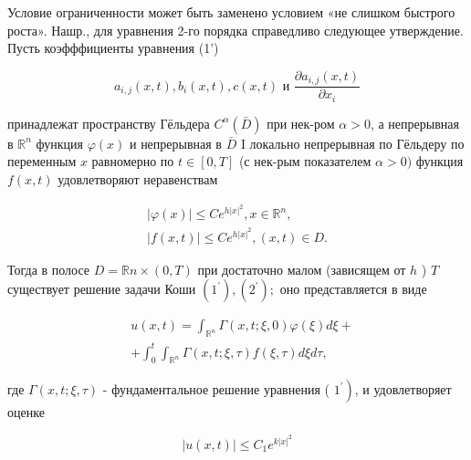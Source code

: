 \documentclass[10pt]{article}
\begin{document}
Условие ограниченности может быть заменено условием «не слишком быстрого роста». Нашр., для уравнения 2-го порядка справедливо следующее утверждение. Пусть коэфффициенты уравнения (1')



\[

a_{i, j}(x, t), b_{i}(x, t), c(x, t) \text { и } \frac{\partial a_{i, j}(x, t)}{\partial x_{i}}

\]



принадлежат пространству Гёльдера $C^{\alpha}(\bar{D})$ при нек-ром $\alpha>0$, а непрерывная в $\mathbb{R}^{n}$ функция $\varphi(x)$ и непрерывная в $\bar{D}$ I локально непрерывная по Гёльдеру по переменным $x$ равномерно по $t \in[0, T]$ (с нек-рым показателем $\alpha>0)$ функция $f(x, t)$ удовлетворяют неравенствам



\[

\begin{gathered}

|\varphi(x)| \leqslant C e^{h|x|^{2}}, x \in \mathbb{R}^{n}, \\

|f(x, t)| \leqslant C e^{h|x|^{2}},(x, t) \in D .

\end{gathered}

\]



Тогда в полосе $D=\mathbb{R} n \times(0, T)$ при достаточно малом (зависящем от $h$ ) $T$ существует решение задачи Коши $\left(1^{\prime}\right),\left(2^{\prime}\right) ;$ оно представляется в виде



\[

\begin{aligned}

& u(x, t)=\int_{\mathbb{R}^{n}} \Gamma(x, t ; \xi, 0) \varphi(\xi) d \xi+ \\

& +\int_{0}^{t} \int_{\mathbb{R}^{n}} \Gamma(x, t ; \xi, \tau) f(\xi, \tau) d \xi d \tau,

\end{aligned}

\]



где $\Gamma(x, t ; \xi, \tau)$ - фундаментальное решение уравнения ( $\left.1^{\prime}\right)$, и удовлетворяет оценке



\[

|u(x, t)| \leqslant C_{1} e^{k|x|^{2}}

\]
\end{document}
